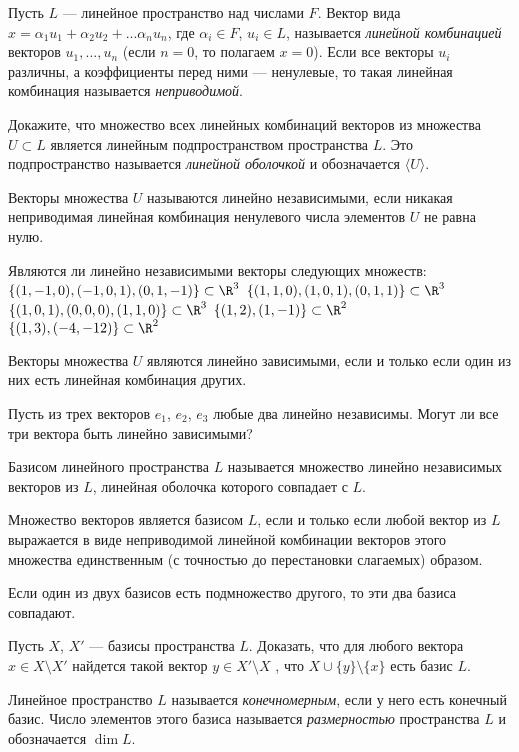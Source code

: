 \documentclass[12pt]{article}
\begin{document}

{ Пусть $L$ --- линейное пространство над числами $F$. Вектор вида $x=\alpha_1 u_1+\alpha_2 u_2+...\alpha_n u_n$, где $\alpha_i \in F$, $u_i \in L $, называется {\it линейной комбинацией} векторов $u_1,...,u_n$ (если $n=0$, то полагаем $x=0$). Если все векторы $u_i$ различны, а коэффициенты перед ними --- ненулевые, то такая линейная комбинация называется {\it неприводимой}.}

\z Докажите, что множество всех линейных комбинаций векторов из множества $U\subset L$ является линейным подпространством пространства $L$. Это подпространство называется {\it линейной оболочкой} и обозначается $\langle U\rangle$.

{ Векторы множества $U$ называются линейно независимыми, если никакая неприводимая линейная комбинация ненулевого числа элементов $U$ не равна нулю.
}

\z Являются ли линейно независимыми векторы следующих множеств:
	\p $\{(1, -1, 0), (-1, 0, 1), (0, 1, -1)\} \subset \R^3$
	\p $\{(1, 1, 0), (1, 0, 1), (0, 1, 1)\} \subset \R^3$
	\p $\{(1,0,1), (0,0,0), (1,1,0)\} \subset \R^3$
	\p $\{(1,2), (1,-1)\} \subset \R^2$ \\
	\p $\{(1,3), (-4,-12)\} \subset \R^2$

\z Векторы множества $U$ являются линейно зависимыми,
если и только если один из них есть линейная комбинация других.

\z Пусть из трех векторов $e_1$, $e_2$, $e_3$ любые два линейно независимы. Могут ли все три вектора быть линейно зависимыми?



{ Базисом линейного пространства $L$ называется
множество линейно независимых векторов из $L$, линейная оболочка
которого совпадает с $L$.}

\z Множество векторов является базисом $L$, если и только
если любой вектор из $L$ выражается в виде неприводимой линейной
комбинации векторов этого множества единственным (с точностью до
перестановки слагаемых) образом.

\z Если один из двух базисов есть подмножество другого, то
эти два базиса совпадают.

\z Пусть $X$, $X'$ --- базисы пространства $L$. Доказать, что
для любого вектора $x \in X \setminus X'$
найдется такой вектор $y \in X' \setminus X$ , что
$X \cup \{y\}\setminus\{x\}$ есть базис $L$.


 Линейное пространство $L$ называется {\it конечномерным},
если у него есть конечный базис. Число элементов этого
базиса называется {\it размерностью} пространства $L$ и обозначается $\dim L$.
\end{document}
